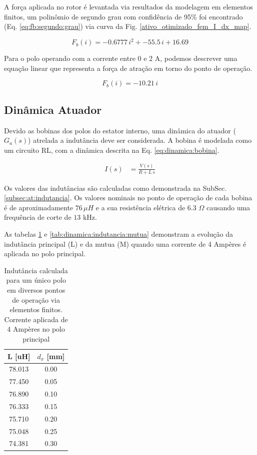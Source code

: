 A força aplicada no rotor é levantada via resultados da modelagem em elementos
finitos, um polinômio de segundo grau com confidência de 95\% foi encontrado
(Eq. \ref{eq:fb:segundo:grau}) via curva da Fig.
\ref{ativo_otimizado_fem_I_dx_map}.

\begin{equation}
     F_b(i) = -0.6777 \, i^2 + -55.5 \, i + 16.69
     \label{eq:fb:segundo:grau}
\end{equation}

Para o polo operando com a corrente entre 0 e 2 A, podemos descrever uma equação linear que representa a força de atração em torno do ponto de operação. 

\begin{equation}
     F_b(i) = -10.21 \, i 
     \label{eq:fb:primeiro:grau}
\end{equation}


\subsection{Dinâmica Atuador}

Devido as bobinas dos polos do estator interno, uma dinâmica do atuador ($G_a(s)$) atrelada a indutância deve ser considerada. A bobina é modelada como um circuito RL, com a dinâmica descrita na Eq. \eqref{eq:dinamica:bobina}.

\begin{align}
	I(s) &= \frac{V(s)}{R + L \, s} 
	\label{eq:dinamica:bobina}
\end{align}

Os valores das indutâncias são calculadas como demonstrada na SubSec. \ref{subsec:at:indutancia}. Os valores nominais no ponto de operação de cada bobina é de aproximadamente $76 \, \mu H$ e a sua resistência elétrica de 6.3 $\Omega$ causando uma frequência de corte de $13$ kHz. 

As tabelas \ref{tab:dinamica:indutancia} e \ref{tab:dinamica:indutancia:mutua} demonstram a evolução da indutância principal (L) e da mutua (M) quando uma corrente de 4 Ampères é aplicada no polo principal. 

\begin{table}[ht!]
	\centering
	\begin{tabular}{c c}
        L [uH]  & $d_x$ [mm] \\
        \hline \hline               
        78.013 & 0.00 \\
        77.450 & 0.05 \\
        76.890 & 0.10 \\
        76.333 & 0.15 \\
        75.710 & 0.20 \\
        75.048 & 0.25 \\
        74.381 & 0.30       
	\end{tabular} 
	\caption{Indutância calculada para um único polo em diversos pontos de operação via elementos finitos. Corrente aplicada de 4 Ampères no polo principal}
	\label{tab:dinamica:indutancia} 
\end{table} 

